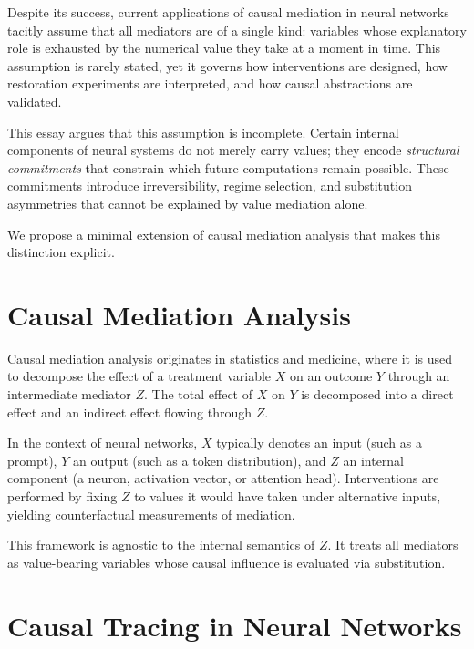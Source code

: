 \documentclass[11pt]{article}
\theoremstyle{remark}
\begin{document}
Despite its success, current applications of causal mediation in neural networks tacitly assume that all mediators are of a single kind: variables whose explanatory role is exhausted by the numerical value they take at a moment in time. This assumption is rarely stated, yet it governs how interventions are designed, how restoration experiments are interpreted, and how causal abstractions are validated.

This essay argues that this assumption is incomplete. Certain internal components of neural systems do not merely carry values; they encode \emph{structural commitments} that constrain which future computations remain possible. These commitments introduce irreversibility, regime selection, and substitution asymmetries that cannot be explained by value mediation alone.

We propose a minimal extension of causal mediation analysis that makes this distinction explicit.

\section{Causal Mediation Analysis}

Causal mediation analysis originates in statistics and medicine, where it is used to decompose the effect of a treatment variable $X$ on an outcome $Y$ through an intermediate mediator $Z$. The total effect of $X$ on $Y$ is decomposed into a direct effect and an indirect effect flowing through $Z$.

In the context of neural networks, $X$ typically denotes an input (such as a prompt), $Y$ an output (such as a token distribution), and $Z$ an internal component (a neuron, activation vector, or attention head). Interventions are performed by fixing $Z$ to values it would have taken under alternative inputs, yielding counterfactual measurements of mediation.

This framework is agnostic to the internal semantics of $Z$. It treats all mediators as value-bearing variables whose causal influence is evaluated via substitution.

\section{Causal Tracing in Neural Networks}
\end{document}
